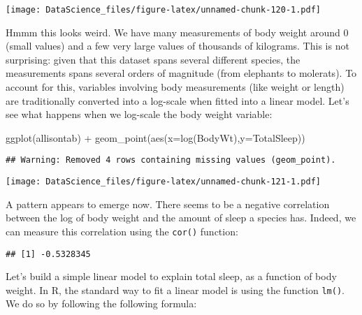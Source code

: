 \documentclass[
]{book}
\newenvironment{Shaded}{\begin{snugshade}}{\end{snugshade}}
\newcommand{\AttributeTok}[1]{\textcolor[rgb]{0.77,0.63,0.00}{#1}}
\newcommand{\FunctionTok}[1]{\textcolor[rgb]{0.00,0.00,0.00}{#1}}
\newcommand{\NormalTok}[1]{#1}
\newcommand{\SpecialCharTok}[1]{\textcolor[rgb]{0.00,0.00,0.00}{#1}}
\newcommand{\StringTok}[1]{\textcolor[rgb]{0.31,0.60,0.02}{#1}}
\begin{document}
\texttt{[image: DataScience\_files/figure-latex/unnamed-chunk-120-1.pdf]}

Hmmm this looks weird. We have many measurements of body weight around 0 (small values) and a few very large values of thousands of kilograms. This is not surprising: given that this dataset spans several different species, the measurements spans several orders of magnitude (from elephants to molerats). To account for this, variables involving body measurements (like weight or length) are traditionally converted into a log-scale when fitted into a linear model. Let's see what happens when we log-scale the body weight variable:

\begin{Shaded}
\begin{Highlighting}[]
\FunctionTok{ggplot}\NormalTok{(allisontab) }\SpecialCharTok{+} \FunctionTok{geom\_point}\NormalTok{(}\FunctionTok{aes}\NormalTok{(}\AttributeTok{x=}\FunctionTok{log}\NormalTok{(BodyWt),}\AttributeTok{y=}\NormalTok{TotalSleep))}
\end{Highlighting}
\end{Shaded}

\begin{verbatim}
## Warning: Removed 4 rows containing missing values (geom_point).
\end{verbatim}

\texttt{[image: DataScience\_files/figure-latex/unnamed-chunk-121-1.pdf]}

A pattern appears to emerge now. There seems to be a negative correlation between the log of body weight and the amount of sleep a species has. Indeed, we can measure this correlation using the \texttt{cor()} function:

\begin{Shaded}
\end{Shaded}

\begin{verbatim}
## [1] -0.5328345
\end{verbatim}

Let's build a simple linear model to explain total sleep, as a function of body weight. In R, the standard way to fit a linear model is using the function \texttt{lm()}. We do so by following the following formula:
\end{document}
